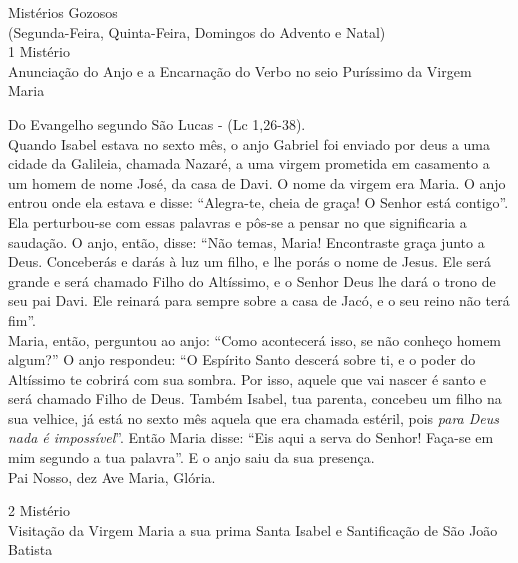 \newpage
\begin{center}
    Mistérios Gozosos \\ \textcolor{VioletRed3}{\scriptsize{(Segunda-Feira, Quinta-Feira, Domingos do Advento e Natal)}} \\
    \hfill{} \break{}
    1\textordmasculine{} Mistério \\ Anunciação do Anjo e a Encarnação do Verbo no seio Puríssimo da Virgem Maria
\end{center}
\begin{flushleft}
    Do Evangelho segundo São Lucas - (\textcolor{VioletRed3}{Lc 1,26-38}). \\
    \hfill{} \break{}
    Quando Isabel estava no sexto mês, o anjo Gabriel foi enviado por deus a uma cidade da Galileia, chamada Nazaré, a uma virgem prometida em casamento a um homem de nome José, da casa de Davi. O nome da virgem era Maria. O anjo entrou onde ela estava e disse: ``Alegra-te, cheia de graça! O Senhor está contigo''. Ela perturbou-se com essas palavras e pôs-se a pensar no que significaria a saudação. O anjo, então, disse: ``Não temas, Maria! Encontraste graça junto a Deus. Conceberás e darás à luz um filho, e lhe porás o nome de Jesus. Ele será grande e será chamado Filho do Altíssimo, e o Senhor Deus lhe dará o trono de seu pai Davi. Ele reinará para sempre sobre a casa de Jacó, e o seu reino não terá fim''.
    \vspace{.2cm} \\
    Maria, então, perguntou ao anjo: ``Como acontecerá isso, se não conheço homem algum?'' O anjo respondeu: ``O Espírito Santo descerá sobre ti, e o poder do Altíssimo te cobrirá com sua sombra. Por isso, aquele que vai nascer é santo e será chamado Filho de Deus. Também Isabel, tua parenta, concebeu um filho na sua velhice, já está no sexto mês aquela que era chamada estéril, pois \textit{para Deus nada é impossível}''. Então Maria disse: ``Eis aqui a serva do Senhor! Faça-se em mim segundo a tua palavra''. E o anjo saiu da sua presença. \\
    \hfill{} \break{}
    Pai Nosso, dez Ave Maria, Glória.
\end{flushleft}
\newpage
\begin{center}
    2\textordmasculine{} Mistério \\ Visitação da Virgem Maria a sua prima Santa Isabel e Santificação de São João Batista
\end{center}
